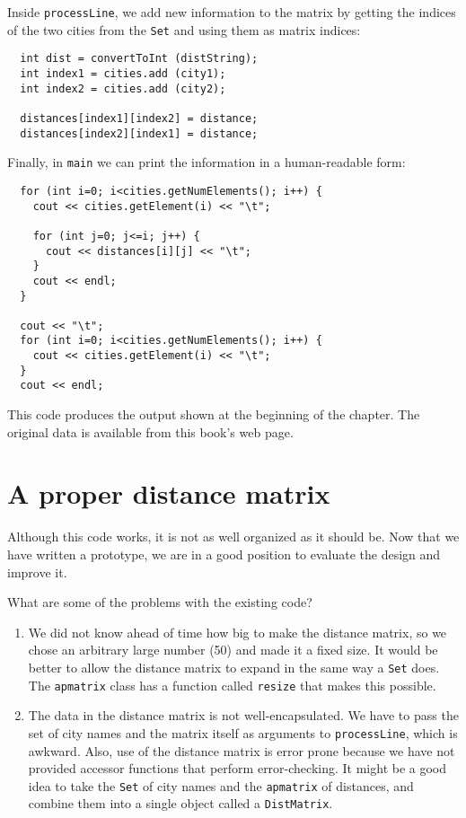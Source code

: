 Inside {\tt processLine}, we add new information to the
matrix by getting the indices of the two cities from the
{\tt Set} and using them as matrix indices:

\begin{verbatim}
  int dist = convertToInt (distString);
  int index1 = cities.add (city1);
  int index2 = cities.add (city2);

  distances[index1][index2] = distance;
  distances[index2][index1] = distance;
\end{verbatim}
%
Finally, in {\tt main} we can print the information in a
human-readable form:

\begin{verbatim}
  for (int i=0; i<cities.getNumElements(); i++) {
    cout << cities.getElement(i) << "\t";

    for (int j=0; j<=i; j++) {
      cout << distances[i][j] << "\t";
    }
    cout << endl;
  }

  cout << "\t";
  for (int i=0; i<cities.getNumElements(); i++) {
    cout << cities.getElement(i) << "\t";
  }
  cout << endl;
\end{verbatim}
%
This code produces the output shown at the beginning of the
chapter.  The original data is available from this book's web page.

\section{A proper distance matrix}

Although this code works, it is not as well organized as it
should be.  Now that we have written a prototype, we are in a
good position to evaluate the design and improve it.

What are some of the problems with the existing code?

\begin{enumerate}

\item We did not know ahead of time how big to make the distance
matrix, so we chose an arbitrary large number (50) and made it
a fixed size.  It would be better to allow the distance matrix
to expand in the same way a {\tt Set} does.  The {\tt apmatrix}
class has a function called {\tt resize} that makes this possible.


\item The data in the distance matrix is not well-encapsulated.
We have to pass the set of city names and the matrix itself
as arguments to {\tt processLine}, which is awkward.  Also,
use of the distance matrix is error prone because we have not
provided accessor functions that perform error-checking.
It might be a good idea to take the {\tt Set} of city names
and the {\tt apmatrix} of distances, and combine them into a
single object called a {\tt DistMatrix}.

\end{enumerate}

